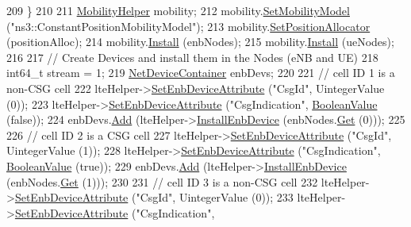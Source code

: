 \begin{DoxyCode}
209     \}
210 
211   \hyperlink{classns3_1_1MobilityHelper}{MobilityHelper} mobility;
212   mobility.\hyperlink{classns3_1_1MobilityHelper_a030275011b6f40682e70534d30280aba}{SetMobilityModel} (\textcolor{stringliteral}{"ns3::ConstantPositionMobilityModel"});
213   mobility.\hyperlink{classns3_1_1MobilityHelper_ac59d5295076be3cc11021566713a28c5}{SetPositionAllocator} (positionAlloc);
214   mobility.\hyperlink{classns3_1_1MobilityHelper_a07737960ee95c0777109cf2994dd97ae}{Install} (enbNodes);
215   mobility.\hyperlink{classns3_1_1MobilityHelper_a07737960ee95c0777109cf2994dd97ae}{Install} (ueNodes);
216 
217   \textcolor{comment}{// Create Devices and install them in the Nodes (eNB and UE)}
218   int64\_t stream = 1;
219   \hyperlink{classns3_1_1NetDeviceContainer}{NetDeviceContainer} enbDevs;
220 
221   \textcolor{comment}{// cell ID 1 is a non-CSG cell}
222   lteHelper->\hyperlink{classns3_1_1LteHelper_ac42f0f3d6cd8473d810bfbbeb5d592e0}{SetEnbDeviceAttribute} (\textcolor{stringliteral}{"CsgId"}, UintegerValue (0));
223   lteHelper->\hyperlink{classns3_1_1LteHelper_ac42f0f3d6cd8473d810bfbbeb5d592e0}{SetEnbDeviceAttribute} (\textcolor{stringliteral}{"CsgIndication"}, 
      \hyperlink{classns3_1_1BooleanValue}{BooleanValue} (\textcolor{keyword}{false}));
224   enbDevs.\hyperlink{classns3_1_1NetDeviceContainer_a7ca8bc1d7ec00fd4fcc63869987fbda5}{Add} (lteHelper->\hyperlink{classns3_1_1LteHelper_a5e009ad35ef85f46b5a6099263f15a03}{InstallEnbDevice} (enbNodes.\hyperlink{classns3_1_1NodeContainer_a9ed96e2ecc22e0f5a3d4842eb9bf90bf}{Get} (0)));
225 
226   \textcolor{comment}{// cell ID 2 is a CSG cell}
227   lteHelper->\hyperlink{classns3_1_1LteHelper_ac42f0f3d6cd8473d810bfbbeb5d592e0}{SetEnbDeviceAttribute} (\textcolor{stringliteral}{"CsgId"}, UintegerValue (1));
228   lteHelper->\hyperlink{classns3_1_1LteHelper_ac42f0f3d6cd8473d810bfbbeb5d592e0}{SetEnbDeviceAttribute} (\textcolor{stringliteral}{"CsgIndication"}, 
      \hyperlink{classns3_1_1BooleanValue}{BooleanValue} (\textcolor{keyword}{true}));
229   enbDevs.\hyperlink{classns3_1_1NetDeviceContainer_a7ca8bc1d7ec00fd4fcc63869987fbda5}{Add} (lteHelper->\hyperlink{classns3_1_1LteHelper_a5e009ad35ef85f46b5a6099263f15a03}{InstallEnbDevice} (enbNodes.\hyperlink{classns3_1_1NodeContainer_a9ed96e2ecc22e0f5a3d4842eb9bf90bf}{Get} (1)));
230 
231   \textcolor{comment}{// cell ID 3 is a non-CSG cell}
232   lteHelper->\hyperlink{classns3_1_1LteHelper_ac42f0f3d6cd8473d810bfbbeb5d592e0}{SetEnbDeviceAttribute} (\textcolor{stringliteral}{"CsgId"}, UintegerValue (0));
233   lteHelper->\hyperlink{classns3_1_1LteHelper_ac42f0f3d6cd8473d810bfbbeb5d592e0}{SetEnbDeviceAttribute} (\textcolor{stringliteral}{"CsgIndication"}, 

\end{DoxyCode}

